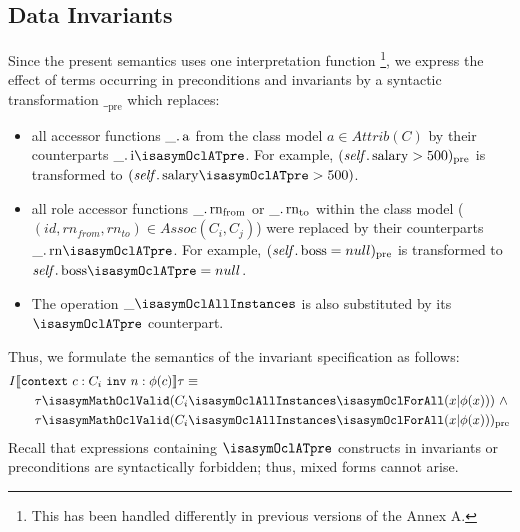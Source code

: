 \subsection{Data Invariants}
\label{sec:invlogic}
Since the present \OCL semantics uses one interpretation function \footnote{This has been handled 
differently in previous versions of the Annex A.}, we express the effect of \OCL terms
occurring in preconditions and invariants by a syntactic transformation $\__\text{pre}$ which 
replaces:
\begin{itemize}
\item all accessor functions $\getAttrib{\_}{a}$ from the class model $a \in Attrib(C)$ by their 
counterparts $\getAttrib{\_}{i\isasymOclATpre}$. For example, $(\getAttrib{\self}{salary} >
500)_\text{pre}$ is transformed to $(\getAttrib{\self}{salary\isasymOclATpre} > 500)$. 
\item all role accessor functions  $\getRole{\_}{rn_{from}}$ or  $\getRole{\_}{rn_{to}}$ 
      within the class model (\ie{} $(id, rn_{from},  rn_{to}) \in Assoc(C_i, C_j)$)
      were replaced by their counterparts $\getRole{\_}{rn\isasymOclATpre}$.
      For example, $(\getAttrib{\self}{boss} = null)_\text{pre}$ is transformed to
      $\getAttrib{\self}{boss\isasymOclATpre} = null$.
\item The operation $\_\isasymOclAllInstances$ is also substituted by its
$\isasymOclATpre$ counterpart.  
\end{itemize}
Thus, we formulate the semantics of the invariant specification  as follows:
\begin{gather}\label{eq:inv}
\begin{aligned}
& I\semantics{\mathtt{context}~c:C_i~\mathtt{inv}~n: \phi(c)} \tau \equiv  \\
&\qquad \tau  \isasymMathOclValid  (C_i\isasymOclAllInstances\isasymOclForAll(x
\text{|} \phi(x)))~\land \\
&\qquad \tau  \isasymMathOclValid (C_i\isasymOclAllInstances\isasymOclForAll(x
\text{|} \phi(x)))_\text{pre} 
\end{aligned}
\end{gather}
Recall that  expressions containing $\isasymOclATpre$ constructs in
invariants or preconditions are syntactically forbidden; thus, mixed forms cannot arise.

